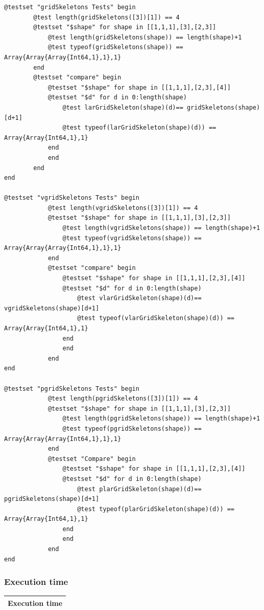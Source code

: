 \documentclass{article}
\begin{document}
\begin{flushleft}\small
\begin{list}{}{} \item
\begin{Verbatim}[tabsize=4]
@testset "gridSkeletons Tests" begin
        @test length(gridSkeletons([3])[1]) == 4
      	@testset "$shape" for shape in [[1,1,1],[3],[2,3]]
			@test length(gridSkeletons(shape)) == length(shape)+1
			@test typeof(gridSkeletons(shape)) == Array{Array{Array{Int64,1},1},1}
		end
		@testset "compare" begin
			@testset "$shape" for shape in [[1,1,1],[2,3],[4]]
			@testset "$d" for d in 0:length(shape)
				@test larGridSkeleton(shape)(d)== gridSkeletons(shape)[d+1] 
				@test typeof(larGridSkeleton(shape)(d)) == Array{Array{Int64,1},1}
			end
			end
		end
end

@testset "vgridSkeletons Tests" begin
            @test length(vgridSkeletons([3])[1]) == 4
      	    @testset "$shape" for shape in [[1,1,1],[3],[2,3]]
			    @test length(vgridSkeletons(shape)) == length(shape)+1
			    @test typeof(vgridSkeletons(shape)) == Array{Array{Array{Int64,1},1},1}
		    end
		    @testset "compare" begin
			    @testset "$shape" for shape in [[1,1,1],[2,3],[4]]
			    @testset "$d" for d in 0:length(shape)
				    @test vlarGridSkeleton(shape)(d)== vgridSkeletons(shape)[d+1] 
				    @test typeof(vlarGridSkeleton(shape)(d)) == Array{Array{Int64,1},1}
			    end
			    end
		    end
end	

@testset "pgridSkeletons Tests" begin
            @test length(pgridSkeletons([3])[1]) == 4
          	@testset "$shape" for shape in [[1,1,1],[3],[2,3]]
    			@test length(pgridSkeletons(shape)) == length(shape)+1
    			@test typeof(pgridSkeletons(shape)) == Array{Array{Array{Int64,1},1},1}
    		end
    		@testset "Compare" begin
    			@testset "$shape" for shape in [[1,1,1],[2,3],[4]]
    			@testset "$d" for d in 0:length(shape)
    				@test plarGridSkeleton(shape)(d)== pgridSkeletons(shape)[d+1] 
    				@test typeof(plarGridSkeleton(shape)(d)) == Array{Array{Int64,1},1}
    			end
    			end
    		end
end

\end{Verbatim}
\end{list}
\end{flushleft}
\subsubsection{Execution time}
\begin{center}
\begin{tabular}{|p{16cm}|}
\hline
\cellcolor[gray]{.9}Execution time\\
\hline
\end{tabular}
\end{center}
\end{document}
